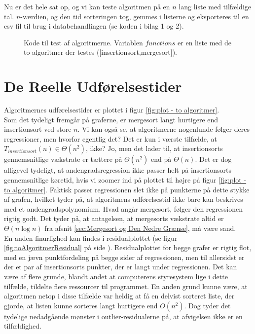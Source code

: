 Nu er det hele sat op, og vi kan teste algoritmen på en $n$ lang liste med tilfældige tal. $n$-værdien, og den tid sorteringen tog, gemmes i listerne og eksporteres til en csv fil til brug i databehandlingen (se koden i bilag 1 og 2).

\begin{figure}
	\begin{center}
		
	\end{center}
	\caption{Kode til test af algoritmerne. Variablen $functions$ er en liste med de to algoritmer der testes ([insertionsort,mergesort]).}
	\label{fig:Kode til test af algoritmerne}
\end{figure}



\section{De Reelle Udførelsestider}
\label{sec:De Reelle Køretider}

Algoritmernes udførelsestider er plottet i figur \ref{fig:plot - to algoritmer}.\\

Som det tydeligt fremgår på graferne, er mergesort langt hurtigere end insertionsort ved store $n$. Vi kan også se, at algoritmerne nogenlunde følger deres regressioner, men hvorfor egentlig det? Det er kun i værste tilfælde, at $T_{insertionsort}(n) \in \Theta (n^2)$, ikke? Jo, men det lader til, at insertionsorts gennemsnitlige vækstrate er tættere på $\Theta (n^2)$ end på $\Theta (n)$. Det er dog alligevel tydeligt, at andengradsregression ikke passer helt på insertionsorts gennemsnitlige køretid, hvis vi zoomer ind på plottet til højre på figur \ref{fig:plot - to algoritmer}. Faktisk passer regressionen slet ikke på punkterne på dette stykke af grafen, hvilket tyder på, at algoritmens udførelsestid ikke bare kan beskrives med et andengradspolynomium. Hvad angår mergesort, følger den regressionen rigtig godt. Det tyder på, at antagelsen, at mergesorts vækstrate altid er $\Theta (n \log n)$ fra afsnit \ref{sec:Mergesort og Den Nedre Grænse}, må være sand.\\

En anden finurlighed kan findes i residualplottet (se figur \ref{fig:toAlgoritmerResidual} på side \pageref{fig:toAlgoritmerResidual}). Residualplottet for begge grafer er rigtig flot, med en jævn punktfordeling på begge sider af regressionen, men til allersidst er der et par af insertionsorts punkter, der er langt under regressionen. Det kan være af flere grunde, blandt andet at computerens styresystem lige i dette tilfælde, tildelte flere ressourcer til programmet. En anden grund kunne være, at algoritmen netop i disse tilfælde var heldig at få en delvist sorteret liste, der gjorde, at listen kunne sorteres langt hurtigere end $O(n^2)$. Dog tyder det tydelige nedadgående mønster i outlier-residualerne på, at afvigelsen ikke er en tilfældighed.\\

